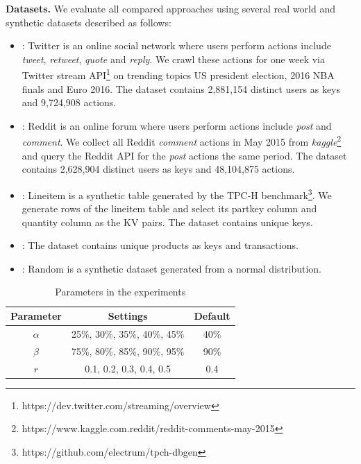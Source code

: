 \vspace{1mm}\noindent\textbf{Datasets.} We evaluate all compared approaches using several real world and synthetic datasets described as follows:
\begin{itemize}
	\item \dstwitter: Twitter is an online social network where users perform actions include \emph{tweet}, \emph{retweet}, \emph{quote} and \emph{reply}.
	We crawl these actions for one week via Twitter stream API\footnote{https://dev.twitter.com/streaming/overview} on trending topics US president election, 2016 NBA finals and Euro 2016. The dataset contains 2,881,154 distinct users as keys and 9,724,908 actions.
	\item \dsreddit: Reddit is an online forum where users perform actions include \emph{post} and \emph{comment}. We collect all Reddit \emph{comment} actions in May 2015 from \emph{kaggle}\footnote{https://www.kaggle.com.reddit/reddit-comments-may-2015} and query the Reddit API for the \emph{post} actions the same period. The dataset contains 2,628,904 distinct users as keys and 48,104,875 actions. 
 	\item \dstpch: Lineitem is a synthetic table generated by the TPC-H benchmark\footnote{https://github.com/electrum/tpch-dbgen}. We generate \xxx rows of the lineitem table and select its partkey column and quantity column as the KV pairs. The dataset contains \xxx unique keys.  
	\item \dsali:  The dataset contains \xxx unique products as keys and \xxx transactions. 
	\item \dsrandom: Random is a synthetic dataset generated from a normal distribution. 
\end{itemize}

\begin{table}
	\centering
	\caption{Parameters in the experiments}
	\label{tbl:parameters}
	\begin{tabular}{|c|c|c|}
		\hline
		\textbf{Parameter} & \textbf{Settings} & \textbf{Default} \\ \hline
		$\alpha$ & 25\%, 30\%, 35\%, 40\%, 45\% & 40\% \\ \hline
		$\beta$  & 75\%, 80\%, 85\%, 90\%, 95\% & 90\% \\ \hline
		$r$ & 0.1, 0.2, 0.3, 0.4, 0.5 & 0.4 \\ \hline
	\end{tabular}
\end{table}

